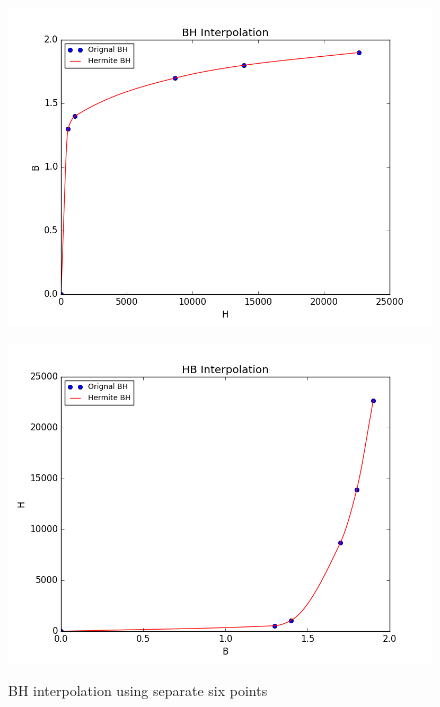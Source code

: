 \documentclass[11pt]{article}
\begin{document}
\begin{figure}[!hbp]
	\begin{center}
		\begin{minipage}{ 0.8\textwidth}
			\includegraphics[width= \textwidth]{H_BH_sep_six.png}\\
		\end{minipage}
		\begin{minipage}{ 0.8\textwidth}
			\includegraphics[width=\textwidth]{H_HB_sep_six.png}\\
		\end{minipage}
		\caption{\label{fig:H_BH_sep_six}BH interpolation using separate six points}
	\end{center}
\end{figure}
\end{document}
